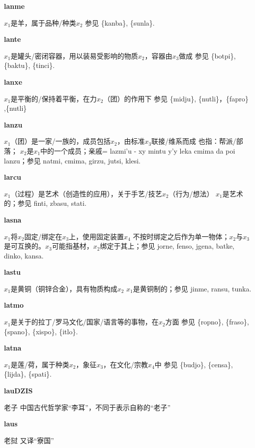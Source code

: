 \documentclass[notitlepage,twocolumn,a4paper,10pt]{book}
\begin{document}
{\sffamily\bfseries lanme}\enspace {\ttfamily\bfseries[lan]}  $x_1$是羊，属于品种\slash{}种类$x_2$ \textemdash{} 参见 \{kanba\}, \{sunla\}.

{\sffamily\bfseries lante} $x_1$是罐头\slash{}密闭容器，用以装易受影响的物质$x_2$，容器由$x_3$做成 \textemdash{} 参见 \{botpi\}, \{baktu\}, \{tinci\}.

{\sffamily\bfseries lanxe}\enspace {\ttfamily\bfseries[lax]}  $x_1$是平衡的\slash{}保持着平衡，在力$x_2$（团）的作用下 \textemdash{} 参见 \{midju\}, \{nutli\}，\{fapro\} ,\{nutli\}

{\sffamily\bfseries lanzu}\enspace {\ttfamily\bfseries[laz]}  $x_1$（团）是一家\slash{}一族的，成员包括$x_2$，由标准$x_3$联接\slash{}维系而成 \textemdash{} 也指：帮派\slash{}部落； $x_2$是$x_1$中的一个成员；亲戚= lazmi'u - xy mintu y'y leka cmima da poi lanzu；参见 {natmi}, {cmima}, {girzu}, {jutsi}, {klesi}.

{\sffamily\bfseries larcu}\enspace {\ttfamily\bfseries[lar]}  $x_1$（过程）是艺术（创造性的应用），关于手艺\slash{}技艺$x_2$（行为\slash{}想法） \textemdash{} $x_1$是艺术的；参见 {finti}, {zbasu}, {stati}.

{\sffamily\bfseries lasna}\enspace {\ttfamily\bfseries[        la'a]}  $x_1$将$x_2$固定\slash{}绑定在$x_3$上，使用固定装置$x_4$ \textemdash{} 不按时绑定之后作为单一物体；$x_2$与$x_3$是可互换的。$x_3$可能指基材，$x_2$绑定于其上；参见 {jorne}, {fenso}, {jgena}, {batke}, {dinko}, {kansa}.

{\sffamily\bfseries lastu} $x_1$是黄铜（铜锌合金），具有物质构成$x_2$ \textemdash{} $x_1$是黄铜制的；参见 {jinme}, {ransu}, {tunka}.

{\sffamily\bfseries latmo}\enspace {\ttfamily\bfseries[        la'o]}  $x_1$是关于的拉丁\slash{}罗马文化\slash{}国家\slash{}语言等的事物，在$x_2$方面 \textemdash{} 参见 \{ropno\}, \{fraso\}, \{spano\}, \{xispo\}, \{itlo\}.

{\sffamily\bfseries latna} $x_1$是莲\slash{}荷，属于种类$x_2$，象征$x_3$，在文化\slash{}宗教$x_4$中 \textemdash{} 参见 \{budjo\}, \{censa\}, \{lijda\}, \{spati\}.

{\sffamily\bfseries lauDZIS} 老子 \textemdash{} 中国古代哲学家“李耳”，不同于表示自称的“老子”

{\sffamily\bfseries laus} 老挝 \textemdash{} 又译“寮国”
\end{document}

